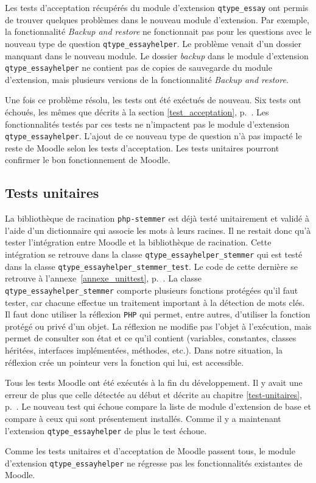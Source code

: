 Les tests d'acceptation r\'ecup\'er\'es du module d'extension \texttt{qtype\_essay} ont permis de trouver quelques probl\`emes  dans le nouveau module d'extension.
Par exemple, la fonctionnalit\'e \textit{Backup and restore} ne fonctionnait pas pour les questions avec le nouveau type de question \texttt{qtype\_essayhelper}.
Le probl\`eme venait d'un dossier manquant dans le nouveau module.
Le dossier \textit{backup} dans le module d'extension \texttt{qtype\_essayhelper} ne contient pas de copies de sauvegarde du module d'extension, mais plusieurs versions de la fonctionnalit\'e \textit{Backup and restore}.

Une fois ce probl\`eme r\'esolu, les tests ont \'et\'e ex\'ectu\'es de nouveau. Six tests ont \'echou\'es, les m\^emes que d\'ecrits \`a la section \ref{test_acceptation}, p.~\pageref{test_acceptation}.
Les fonctionnalit\'es test\'es par ces tests ne n'impactent pas le module d'extension \texttt{qtype\_essayhelper}.
L'ajout de ce nouveau type de question n'\`a pas impact\'e le reste de Moodle selon les tests d'acceptation.
Les tests unitaires pourront confirmer le bon fonctionnement de Moodle.

\subsection{Tests unitaires} \label{dev_test_unitaire}
La biblioth\`eque de racination \texttt{php-stemmer} est d\'ej\`a test\'e unitairement et valid\'e \`a l'aide d'un dictionnaire qui associe les mots \`a leurs racines.
Il ne restait donc qu'\`a tester l'int\'egration entre Moodle et la biblioth\`eque de racination.
Cette int\'egration se retrouve dans la classe \texttt{qtype\_essayhelper\_stemmer} qui est test\'e dans la classe \texttt{qtype\_essayhelper\_stemmer\_test}.
Le code de cette derni\`ere se retrouve \`a l'annexe~\ref{annexe_unittest}, p.~\pageref{annexe_unittest}.
La classe \texttt{qtype\_essayhelper\_stemmer} comporte plusieurs fonctions prot\'eg\'ees qu'il faut tester, car chacune effectue un traitement important \`a la d\'etection de mots cl\'es.
Il faut donc utiliser la r\'eflexion \texttt{PHP} qui permet, entre autres, d'utiliser la fonction prot\'eg\'e ou priv\'e d'un objet.
La r\'eflexion ne modifie pas l'objet \`a l'ex\'ecution, mais permet de consulter son \'etat et ce qu'il contient (variables, constantes, classes h\'erit\'ees, interfaces impl\'ement\'ees, m\'ethodes, etc.).
Dans notre situation, la r\'eflexion cr\'ee un pointeur vers la fonction qui lui, est accessible.

Tous les tests Moodle ont \'et\'e ex\'ecut\'es \`a la fin du d\'eveloppement.
Il y avait une erreur de plus que celle d\'etect\'ee au d\'ebut et d\'ecrite au chapitre \ref{test-unitaires}, p.~\pageref{test-unitaires}.
Le nouveau test qui \'echoue compare la liste de module d'extension de base et compare \`a ceux qui sont pr\'esentement install\'es.
Comme il y a maintenant l'extension \texttt{qtype\_essayhelper} de plus le test \'echoue.

Comme les tests unitaires et d'acceptation de Moodle passent tous, le module d'extension \texttt{qtype\_essayhelper} ne r\'egresse pas les fonctionnalit\'es existantes de Moodle.